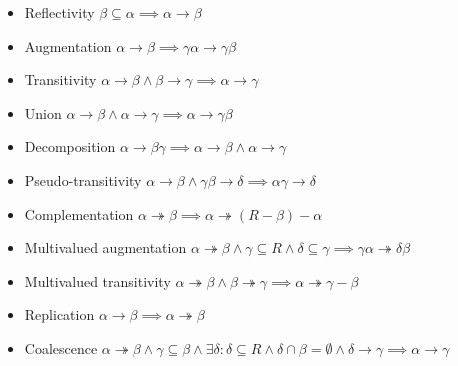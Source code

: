\documentclass[11pt, a4paper, oneside]{book}
\newcommand{\determines}{\rightarrow}
\newcommand{\multidetemines}{\twoheadrightarrow}
\begin{document}
\begin{itemize}
    \setlength{\itemsep}{0pt}
    \setlength{\parskip}{0pt}
    \item[] Reflectivity $\beta \subseteq \alpha \implies \alpha \determines \beta $
    \item[] Augmentation $\alpha \determines \beta \implies \gamma\alpha \determines \gamma\beta $
    \item[] Transitivity $\alpha \determines \beta \wedge \beta \determines \gamma \implies \alpha \determines \gamma $
    \item[] Union $\alpha \determines \beta \wedge \alpha \determines \gamma \implies \alpha \determines \gamma\beta $
    \item[] Decomposition $\alpha \determines \beta\gamma \implies \alpha \determines \beta \wedge \alpha \determines \gamma $
    \item[] Pseudo-transitivity $\alpha \determines \beta \wedge \gamma\beta \determines \delta \implies \alpha\gamma \determines \delta $
    \item[] Complementation $\alpha \multidetemines \beta \implies \alpha \multidetemines (R - \beta ) - \alpha$
    \item[] Multivalued augmentation $\alpha \multidetemines \beta \wedge \gamma \subseteq R \wedge \delta \subseteq \gamma \implies \gamma\alpha \multidetemines \delta\beta$
    \item[] Multivalued transitivity $\alpha \multidetemines \beta \wedge \beta \multidetemines \gamma \implies \alpha \multidetemines \gamma - \beta $
    \item[] Replication $\alpha \determines \beta \implies \alpha \multidetemines \beta$
    \item[] Coalescence $\alpha \multidetemines \beta \wedge \gamma \subseteq \beta \wedge \exists\delta : \delta \subseteq R \wedge \delta \cap \beta = \emptyset \wedge \delta \determines \gamma \implies \alpha \determines \gamma$
\end{itemize}
\end{document}
